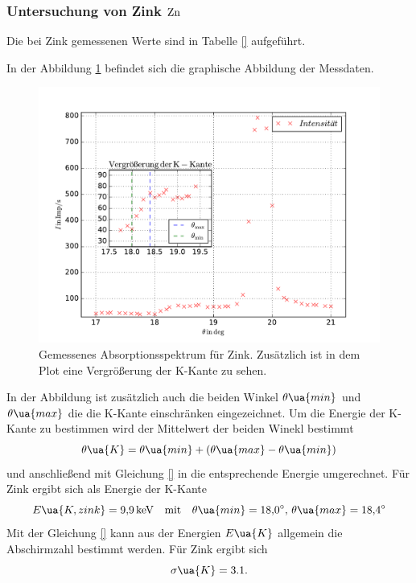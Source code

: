 \subsubsection{Untersuchung von Zink $\ce{Zn}$}\label{sec: zink}
Die bei Zink gemessenen Werte sind in Tabelle \ref{} aufgeführt.

In der Abbildung \ref{fig: absotp_zink} befindet sich die graphische Abbildung der Messdaten.
\begin{figure}
  \centering
  \includegraphics[width=1.2\textwidth]{../Messdaten/zink.pdf}
  \caption{Gemessenes Absorptionsspektrum für Zink. Zusätzlich ist in dem Plot eine Vergrößerung der K-Kante zu sehen.} %
  \label{fig: absotp_zink}
\end{figure}
In der Abbildung ist zusätzlich auch die beiden Winkel $\theta\ua{min}$ und $\theta\ua{max}$ die die K-Kante einschränken
eingezeichnet. Um die Energie der K-Kante zu bestimmen wird der Mittelwert der beiden Winekl bestimmt
\begin{equation}
  \label{eq:theta_k}
  \theta\ua{K}=\theta\ua{min}+\left(\theta\ua{max}-\theta\ua{min}\right)
\end{equation}
und anschließend mit Gleichung \eqref{} in die entsprechende Energie umgerechnet.
Für Zink ergibt sich als Energie der K-Kante
\begin{equation*}
  E\ua{K,zink}=\SI{9.9}{\kilo\eV} \quad \text{mit}\quad \theta\ua{min}=\SI{18.0}{\degree},\,\theta\ua{max}=\SI{18.4}{\degree}
\end{equation*}
Mit der Gleichung \eqref{} kann aus der Energien $E\ua{K}$ allgemein die Abschirmzahl
bestimmt werden.
Für Zink ergibt sich
\begin{equation}
  \label{eq: abschirm_zink}
  \sigma\ua{K}=3.1.
\end{equation}
